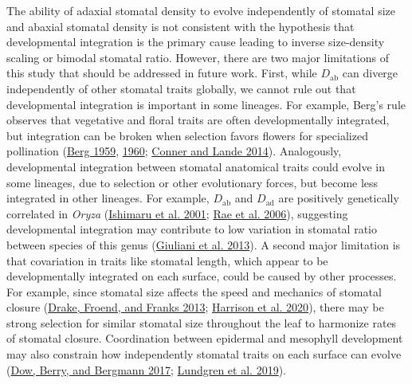 \documentclass[
  10pt,
]{article}
\begin{document}
The ability of adaxial stomatal density to evolve independently of stomatal size and abaxial stomatal density is not consistent with the hypothesis that developmental integration is the primary cause leading to inverse size-density scaling or bimodal stomatal ratio. However, there are two major limitations of this study that should be addressed in future work. First, while \(D_\text{ab}\) can diverge independently of other stomatal traits globally, we cannot rule out that developmental integration is important in some lineages. For example, Berg's rule observes that vegetative and floral traits are often developmentally integrated, but integration can be broken when selection favors flowers for specialized pollination (\protect\hyperlink{ref-berg_general_1959}{Berg 1959}, \protect\hyperlink{ref-berg_ecological_1960}{1960}; \protect\hyperlink{ref-conner_raissa_2014}{Conner and Lande 2014}). Analogously, developmental integration between stomatal anatomical traits could evolve in some lineages, due to selection or other evolutionary forces, but become less integrated in other lineages. For example, \(D_\text{ab}\) and \(D_\text{ad}\) are positively genetically correlated in \emph{Oryza} (\protect\hyperlink{ref-ishimaru_identification_2001}{Ishimaru et al. 2001}; \protect\hyperlink{ref-rae_elucidating_2006}{Rae et al. 2006}), suggesting developmental integration may contribute to low variation in stomatal ratio between species of this genus (\protect\hyperlink{ref-giuliani_coordination_2013}{Giuliani et al. 2013}). A second major limitation is that covariation in traits like stomatal length, which appear to be developmentally integrated on each surface, could be caused by other processes. For example, since stomatal size affects the speed and mechanics of stomatal closure (\protect\hyperlink{ref-drake_smaller_2013}{Drake, Froend, and Franks 2013}; \protect\hyperlink{ref-harrison_influence_2020}{Harrison et al. 2020}), there may be strong selection for similar stomatal size throughout the leaf to harmonize rates of stomatal closure. Coordination between epidermal and mesophyll development may also constrain how independently stomatal traits on each surface can evolve (\protect\hyperlink{ref-dow_disruption_2017}{Dow, Berry, and Bergmann 2017}; \protect\hyperlink{ref-lundgren_mesophyll_2019}{Lundgren et al. 2019}).
\end{document}
